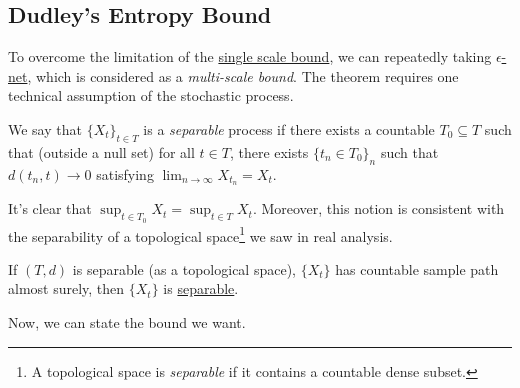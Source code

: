 \subsection{Dudley's Entropy Bound}
To overcome the limitation of the \hyperref[lma:single-scale-bound]{single scale bound}, we can repeatedly taking \hyperref[def:eps-net]{\(\epsilon\)-net}, which is considered as a \emph{multi-scale bound}. The theorem requires one technical assumption of the stochastic process.

\begin{definition}[Separable]\label{def:separable}
	We say that \(\{X_t\}_{t\in T}\) is a \emph{separable} process if there exists a countable \(T_0 \subseteq T\) such that (outside a null set) for all \(t\in T\), there exists \(\{t_n \in T_0\}_{n}\) such that \(d(t_n, t) \to 0\) satisfying \(\lim_{n \to \infty} X_{t_n} = X_t\).
\end{definition}

It's clear that \(\sup _{t\in T_0} X_t = \sup _{t\in T} X_t\). Moreover, this notion is consistent with the separability of a topological space\footnote{A topological space is \emph{separable} if it contains a countable dense subset.} we saw in real analysis.

\begin{eg}
	If \((T, d)\) is separable (as a topological space), \(\{ X_t \} \) has countable sample path almost surely, then \(\{ X_t \} \) is \hyperref[def:separable]{separable}.
\end{eg}

Now, we can state the bound we want.

